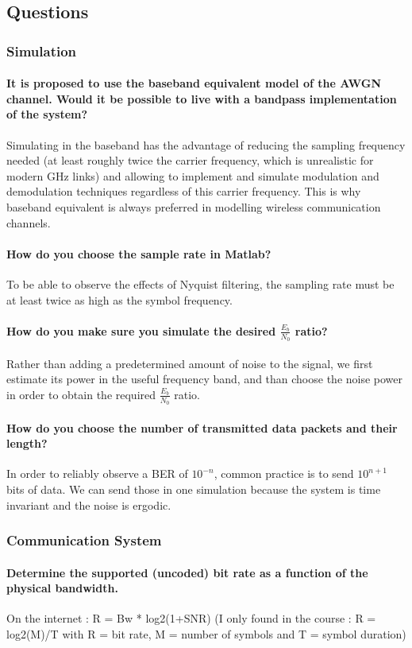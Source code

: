 \subsection{Questions}
\subsubsection{Simulation}
\paragraph{It is proposed to use the baseband equivalent model of the AWGN channel. Would it be
possible to live with a bandpass implementation of the system?}
Simulating in the baseband has the advantage of reducing the sampling frequency needed (at least roughly twice the carrier frequency, which is unrealistic for modern \si{\giga\hertz} links) and allowing to implement and simulate modulation and demodulation techniques regardless of this carrier frequency.
This is why baseband equivalent is always preferred in modelling wireless communication channels.
\paragraph{How do you choose the sample rate in Matlab?}
To be able to observe the effects of Nyquist filtering, the sampling rate must be at least twice as high as the symbol frequency.
\paragraph{How do you make sure you simulate the desired $\frac{E_b}{N_0}$ ratio?}
Rather than adding a predetermined amount of noise to the signal, we first estimate its power in the useful frequency band, and than choose the noise power in order to obtain the required $\frac{E_b}{N_0}$ ratio.
\paragraph{How do you choose the number of transmitted data packets and their length?}
In order to reliably observe a BER of $10^{-n}$, common practice is to send $10^{n+1}$ bits of data. We can send those in one simulation because the system is time invariant and the noise is ergodic.
\subsubsection{Communication System}
\paragraph{Determine the supported (uncoded) bit rate as a function of the physical bandwidth.} On the internet : R = Bw * log2(1+SNR) (I only found in the course : R = log2(M)/T with R = bit rate, M = number of symbols and T = symbol duration)
